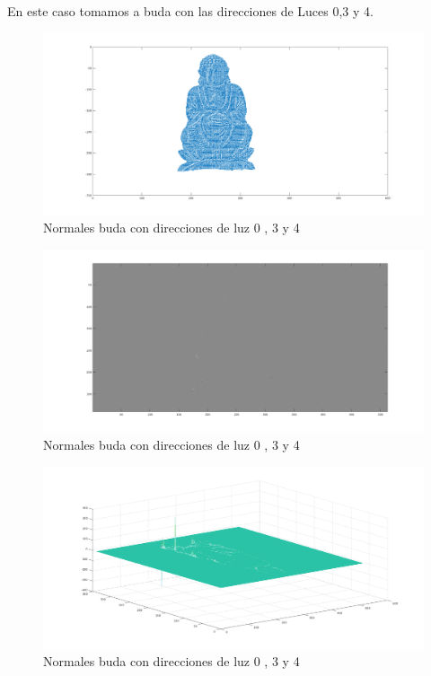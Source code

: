 

En este caso tomamos a buda con las direcciones de Luces 0,3 y 4.

\begin{figure}[H]	
	\centering
	\includegraphics[width=1\linewidth]{img/buda034normales.png}
	\caption{Normales buda con direcciones de luz 0 , 3 y 4}
    \label{fig:resultado}
\end{figure}

\begin{figure}[H]	
	\centering
	\includegraphics[width=1\linewidth]{img/buda034depth.png}
	\caption{Normales buda con direcciones de luz 0 , 3 y 4}
    \label{fig:resultado}
\end{figure}

\begin{figure}[H]	
	\centering
	\includegraphics[width=1\linewidth]{img/buda034modelo.png}
	\caption{Normales buda con direcciones de luz 0 , 3 y 4}
    \label{fig:resultado}
\end{figure}